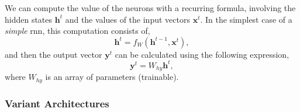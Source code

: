 We can compute the value of the neurons with a recurring formula, involving the
hidden states \(\mathbf{h}^t\) and the values of the input vectors
\(\mathbf{x}^t\). In the simplest case of a \emph{simple} \gls{rnn}, this
computation consists of,
\begin{equation} \label{eq:rnn-hidden}
  \mathbf{h}^t = f_{W} (\mathbf{h}^{t - 1}, \mathbf{x}^t),
\end{equation}
and then the output vector \(\mathbf{y}^t\) can be calculated using the
following expression,
\begin{equation} \label{eq:rnn-out}
  \mathbf{y}^t = W_{hy}\mathbf{h}^t,
\end{equation}
where \(W_{hy}\) is an array of parameters (trainable).

\subsubsection{Variant  Architectures}


